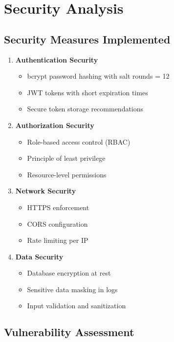 \documentclass[12pt,a4paper]{article}
\begin{document}
\section{Security Analysis}

\subsection{Security Measures Implemented}

\begin{enumerate}
    \item \textbf{Authentication Security}
    \begin{itemize}
        \item bcrypt password hashing with salt rounds = 12
        \item JWT tokens with short expiration times
        \item Secure token storage recommendations
    \end{itemize}
    
    \item \textbf{Authorization Security}
    \begin{itemize}
        \item Role-based access control (RBAC)
        \item Principle of least privilege
        \item Resource-level permissions
    \end{itemize}
    
    \item \textbf{Network Security}
    \begin{itemize}
        \item HTTPS enforcement
        \item CORS configuration
        \item Rate limiting per IP
    \end{itemize}
    
    \item \textbf{Data Security}
    \begin{itemize}
        \item Database encryption at rest
        \item Sensitive data masking in logs
        \item Input validation and sanitization
    \end{itemize}
\end{enumerate}

\subsection{Vulnerability Assessment}
\end{document}
